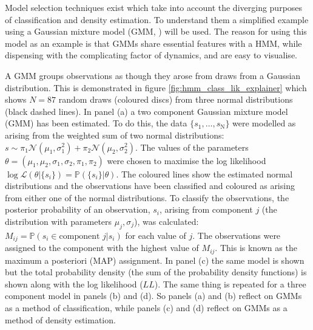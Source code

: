 Model selection techniques exist which take into account the diverging purposes of classification and density estimation. To understand them a  simplified example using a Gaussian mixture model (GMM, \cite{reynolds2009gaussian}) will be used. The reason for using this model as an example is that GMMs share essential features with a HMM, while dispensing with the complicating factor of dynamics, and are easy to visualise.  

A GMM groups observations as though they arose from draws from a Gaussian distribution. This is demonstrated in figure \ref{fig:hmm_class_lik_explainer} which shows $N = \num{87}$ random draws (coloured discs) from three normal distributions (black dashed lines). In panel (a) a two component Gaussian mixture model (GMM) has been estimated. To do this, the data $\{s_{1}, \ldots, s_{\mathrm{N}}\}$ were modelled as arising from the weighted sum of two normal distributions: $s \sim \pi_{1}\mathcal{N}\left(\mu_{1}, \sigma_{1}^{2}\right) +  \pi_{2}\mathcal{N}\left(\mu_{2}, \sigma_{2}^{2}\right)$. The values of the parameters $\theta = (\mu_{1}, \mu_{2}, \sigma_{1}, \sigma_{2}, \pi_{1}, \pi_{2})$ were chosen to maximise the log likelihood $\log{\mathcal{L}(\theta | \{s_{i}\})} = \mathbb{P}(\{s_{i}\}|\theta)$.  The coloured lines show the estimated normal distributions and the observations have been classified and coloured as arising from either one of the normal distributions. To classify the observations, the posterior probability of an  observation, $s_{i}$, arising from component $j$ (the distribution with parameters $\mu_{j}, \sigma_{j}$), was calculated: $M_{ij}=\mathbb{P}(s_{i} \in \text{component }j |s_{i})$ for each value of $j$. The observations were assigned to the component with the highest value of $M_{ij}$. This is known as the maximum a posteriori (MAP) assignment. In panel (c) the same model is shown but the total probability density (the sum of the probability density functions) is shown along with the log likelihood ($LL$). The same thing is repeated for a three component model in panels (b) and (d). So panels (a) and (b) reflect on GMMs as a method of classification, while panels (c) and (d) reflect on GMMs as a method of density estimation. 

